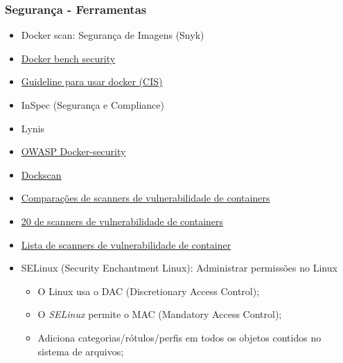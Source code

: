 \begin{frame}[t]
	\frametitle{Segurança - Ferramentas}
	\begin{itemize}
		\item Docker scan: Segurança de Imagens (Snyk)
		\item \href{https://github.com/docker/docker-bench-security}{Docker bench security}
		\item \href{https://www.cisecurity.org/benchmark/docker}{Guideline para usar docker (CIS)}
		\item InSpec (Segurança e Compliance)
		\item Lynis
		\item \href{https://github.com/OWASP/Docker-Security}{OWASP Docker-security}
		\item \href{https://github.com/kost/dockscan}{Dockscan}
		\item \href{https://www.slideshare.net/jlkinsel/a-fun-comparison-of-docker-vulnerability-scanners/}{Comparações de scanners de vulnerabilidade de containers}
		\item \href{https://sysdig.com/blog/20-docker-security-tools/}{20 de scanners de vulnerabilidade de containers}
		\item \href{https://thenewstack.io/draft-vulnerability-scanners/}{Lista de scanners de vulnerabilidade de container}
		\item SELinux (Security Enchantment Linux): Administrar permissões no Linux
			\begin{itemize}
				\item O Linux usa o DAC (Discretionary Access Control);
				\item O \textit{SELinux} permite o MAC (Mandatory Access Control);
				\item Adiciona categorias/rótulos/perfis em todos os objetos contidos no sistema de arquivos;
			\end{itemize}
	\end{itemize}
\end{frame}

